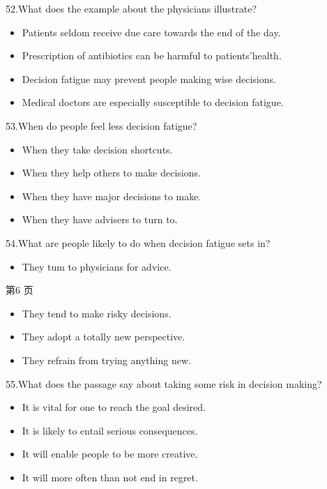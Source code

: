 \documentclass[UTF8,11pt]{ctexart}
\begin{document}
52.What does the example about the physicians illustrate?


\begin{itemize}[leftmargin=2em,itemsep=.2em,topsep=.4em]\item[A.] Patients seldom receive due care towards the end of the day.
\item[B.] Prescription of antibiotics can be harmful to patients'health.
\item[C.] Decision fatigue may prevent people making wise decisions.
\item[D.] Medical doctors are especially susceptible to decision fatigue.
\end{itemize}

53.When do people feel less decision fatigue?


\begin{itemize}[leftmargin=2em,itemsep=.2em,topsep=.4em]\item[A.] When they take decision shortcuts.
\item[B.] When they help others to make decisions.
\item[C.] When they have major decisions to make.
\item[D.] When they have advisers to turn to.
\end{itemize}

54.What are people likely to do when decision fatigue sets in?


\begin{itemize}[leftmargin=2em,itemsep=.2em,topsep=.4em]\item[A.] They tum to physicians for advice.
\end{itemize}

第6 页


\begin{itemize}[leftmargin=2em,itemsep=.2em,topsep=.4em]\item[B.] They tend to make risky decisions.
\item[C.] They adopt a totally new perspective.
\item[D.] They refrain from trying anything new.
\end{itemize}

55.What does the passage say about taking some risk in decision making?


\begin{itemize}[leftmargin=2em,itemsep=.2em,topsep=.4em]\item[A.] It is vital for one to reach the goal desired.
\item[B.] It is likely to entail serious consequences.
\item[C.] It will enable people to be more creative.
\item[D.] It will more often than not end in regret.
\end{itemize}
\end{document}
